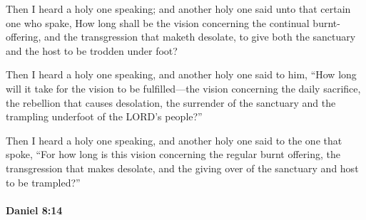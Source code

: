 			\begin{versebox}
					\item[BHS] 
					\item[LXX] 
					\item[ASV] Then I heard a holy one speaking; and another holy one said unto that certain one who spake, How long shall be the vision concerning the continual burnt-offering, and the transgression that maketh desolate, to give both the sanctuary and the host to be trodden under foot?
					\item[NIV] Then I heard a holy one speaking, and another holy one said to him, “How long will it take for the vision to be fulfilled—the vision concerning the daily sacrifice, the rebellion that causes desolation, the surrender of the sanctuary and the trampling underfoot of the LORD’s people?”
					\item[NRSV] Then I heard a holy one speaking, and another holy one said to the one that spoke, “For how long is this vision concerning the regular burnt offering, the transgression that makes desolate, and the giving over of the sanctuary and host to be trampled?”
			\end{versebox}

		\paragraph{Daniel 8:14} %
			\label{DANIEL-8-14}

